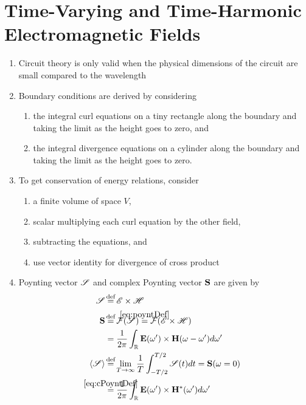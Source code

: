 \documentclass{article}
\begin{document}
\section{Time-Varying and Time-Harmonic Electromagnetic Fields}
\begin{enumerate}
   \item Circuit theory is only valid when the physical dimensions of the circuit are
   small compared to the wavelength
   \item Boundary conditions are derived by considering 
   \begin{enumerate}
      \item the integral curl equations on a tiny rectangle along the boundary and
         taking the limit as the height goes to zero, and
      \item the integral divergence equations on a cylinder along the boundary and
         taking the limit as the height goes to zero.
   \end{enumerate}
   \item To get conservation of energy relations, consider 
   \begin{enumerate}
      \item a finite volume of space $V$,
      \item scalar multiplying each curl equation by the other field,
      \item subtracting the equations, and 
      \item use vector identity for divergence of cross product
   \end{enumerate}
   \item Poynting vector $\mathscr{S}$ and complex Poynting vector $\mathbf{S}$ are given by 
   \begin{align}
      \poynt & \defeq \eTime \times \hTime \label{eq:poyntDef} \\
      \cPoynt & \defeq \fourier ( \poynt ) \eqBy{eq:poyntDef} \fourier ( \eTime
         \times \hTime ) \nonumber \\
      &= \frac{1}{2\pi} \int_{\reals} \mathbf{E}(\angFreq') \times
         \mathbf{H}(\angFreq - \angFreq') d\angFreq' \label{eq:cPoyntDef} \\ 
      \poyntAvg & \defeq \lim_{T \to \infty} \frac{1}{T} \int_{-T/2}^{T/2} \poynt (t)
      dt = \cPoynt(\angFreq = 0) \nonumber \\
      & \eqBy{eq:cPoyntDef} \frac{1}{2 \pi} \int_{\reals} \eFreq ( \angFreq' ) \times
      \hFreq^* (\angFreq') d \angFreq' \label{eq:poyntAvgDef}
   \end{align}
\end{enumerate}
\end{document}
